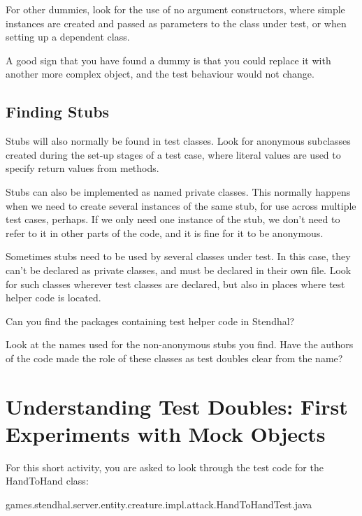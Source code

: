 \documentclass[
]{book}
\newenvironment{Shaded}{\begin{snugshade}}{\end{snugshade}}
\newcommand{\FunctionTok}[1]{\textcolor[rgb]{0.00,0.00,0.00}{#1}}
\newcommand{\NormalTok}[1]{#1}
\begin{document}
For other dummies, look for the use of no argument constructors, where simple instances are created and passed as parameters to the class under test, or when setting up a dependent class.

A good sign that you have found a dummy is that you could replace it with another more complex object, and the test behaviour would not change.

\hypertarget{findstubs}{%
\subsection{Finding Stubs}\label{findstubs}}

Stubs will also normally be found in test classes. Look for anonymous subclasses created during the set-up stages of a test case, where literal values are used to specify return values from methods.

Stubs can also be implemented as named private classes. This normally happens when we need to create several instances of the same stub, for use across multiple test cases, perhaps. If we only need one instance of the stub, we don't need to refer to it in other parts of the code, and it is fine for it to be anonymous.

Sometimes stubs need to be used by several classes under test. In this case, they can't be declared as private classes, and must be declared in their own file. Look for such classes wherever test classes are declared, but also in places where test helper code is located.

Can you find the packages containing test helper code in Stendhal?

Look at the names used for the non-anonymous stubs you find. Have the authors of the code made the role of these classes as test doubles clear from the name?

\hypertarget{mockobjects}{%
\section{Understanding Test Doubles: First Experiments with Mock Objects}\label{mockobjects}}

For this short activity, you are asked to look through the test code for the HandToHand class:

\begin{Shaded}
\begin{Highlighting}[]
\NormalTok{games.}\FunctionTok{stendhal}\NormalTok{.}\FunctionTok{server}\NormalTok{.}\FunctionTok{entity}\NormalTok{.}\FunctionTok{creature}\NormalTok{.}\FunctionTok{impl}\NormalTok{.}\FunctionTok{attack}\NormalTok{.}\FunctionTok{HandToHandTest}\NormalTok{.}\FunctionTok{java}
\end{Highlighting}
\end{Shaded}
\end{document}
